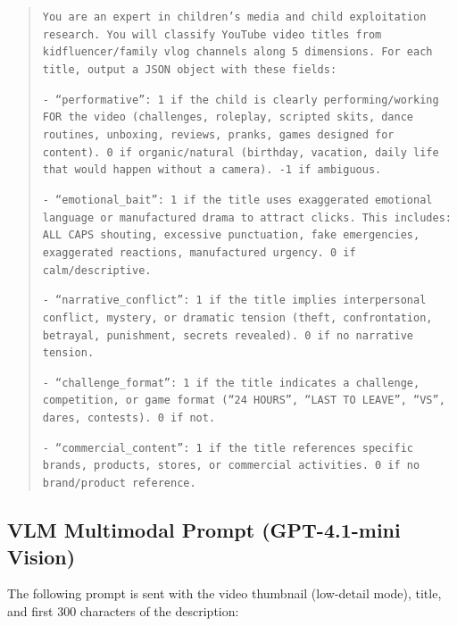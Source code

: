 \documentclass[]{ieeeaccess}
\begin{document}
\begin{quote}
\texttt{You are an expert in children's media and child exploitation research. You will classify YouTube video titles from kidfluencer/family vlog channels along 5 dimensions. For each title, output a JSON object with these fields:}

\texttt{- ``performative'': 1 if the child is clearly performing/working FOR the video (challenges, roleplay, scripted skits, dance routines, unboxing, reviews, pranks, games designed for content). 0 if organic/natural (birthday, vacation, daily life that would happen without a camera). -1 if ambiguous.}

\texttt{- ``emotional\_bait'': 1 if the title uses exaggerated emotional language or manufactured drama to attract clicks. This includes: ALL CAPS shouting, excessive punctuation, fake emergencies, exaggerated reactions, manufactured urgency. 0 if calm/descriptive.}

\texttt{- ``narrative\_conflict'': 1 if the title implies interpersonal conflict, mystery, or dramatic tension (theft, confrontation, betrayal, punishment, secrets revealed). 0 if no narrative tension.}

\texttt{- ``challenge\_format'': 1 if the title indicates a challenge, competition, or game format (``24 HOURS'', ``LAST TO LEAVE'', ``VS'', dares, contests). 0 if not.}

\texttt{- ``commercial\_content'': 1 if the title references specific brands, products, stores, or commercial activities. 0 if no brand/product reference.}
\end{quote}

\subsection{VLM Multimodal Prompt (GPT-4.1-mini Vision)}

The following prompt is sent with the video thumbnail (low-detail mode), title, and first 300 characters of the description:
\end{document}
